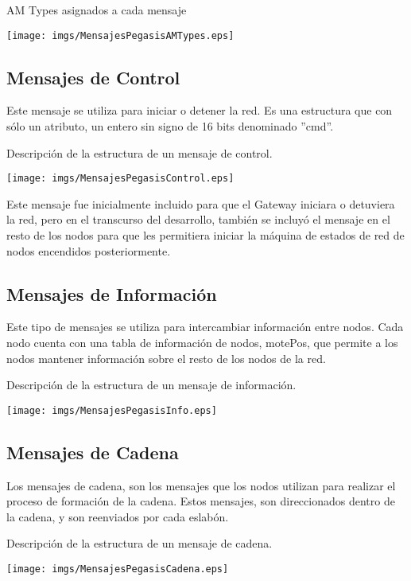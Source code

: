 \begin{table}[H]
  \centering
  \caption{AM Types asignados a cada mensaje}
 \texttt{[image: imgs/MensajesPegasisAMTypes.eps]}
\end{table}

\subsection{Mensajes de Control}
Este mensaje se utiliza para iniciar o detener la red. Es una estructura que con sólo un atributo, un entero sin signo de 16 bits denominado ''cmd''. 

\begin{table}[H]
  \centering
  \caption{Descripción de la estructura de un mensaje de control.}
 \texttt{[image: imgs/MensajesPegasisControl.eps]}
\end{table}

Este mensaje fue inicialmente incluido para que el Gateway iniciara o detuviera la red, pero en el transcurso del desarrollo, también se incluyó el mensaje en el resto de los nodos para que les permitiera iniciar la máquina de estados de red de nodos encendidos posteriormente.

\subsection{Mensajes de Información}
Este tipo de mensajes se utiliza para intercambiar información entre nodos. Cada nodo cuenta con una tabla de información de nodos, motePos, que permite a los nodos mantener información sobre el resto de los nodos de la red.
 
\begin{table}[H]
  \centering
  \caption{Descripción de la estructura de un mensaje de información.}
 \texttt{[image: imgs/MensajesPegasisInfo.eps]}
\end{table}

\subsection{Mensajes de Cadena}
Los mensajes de cadena, son los mensajes que los nodos utilizan para realizar el proceso de formación de la cadena. Estos mensajes, son direccionados dentro de la cadena, y son reenviados por cada eslabón.

\begin{table}[H]
  \centering
  \caption{Descripción de la estructura de un mensaje de cadena.}
 \texttt{[image: imgs/MensajesPegasisCadena.eps]}
\end{table}


